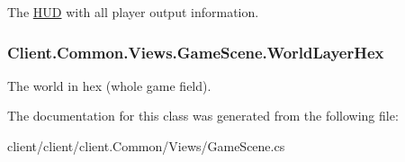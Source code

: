 The \hyperlink{namespaceClient_1_1Common_1_1Views_1_1HUD}{H\+U\+D} with all player output information. 

\hypertarget{classClient_1_1Common_1_1Views_1_1GameScene_af3de419dcf8598986518a62b075b915a}{}
\subsubsection[{World\+Layer\+Hex}]{ Client.\+Common.\+Views.\+Game\+Scene.\+World\+Layer\+Hex}\label{classClient_1_1Common_1_1Views_1_1GameScene_af3de419dcf8598986518a62b075b915a}


The world in hex (whole game field). 



The documentation for this class was generated from the following file\+:\begin{DoxyCompactItemize}
\item 
client/client/client.\+Common/\+Views/Game\+Scene.\+cs\end{DoxyCompactItemize}
